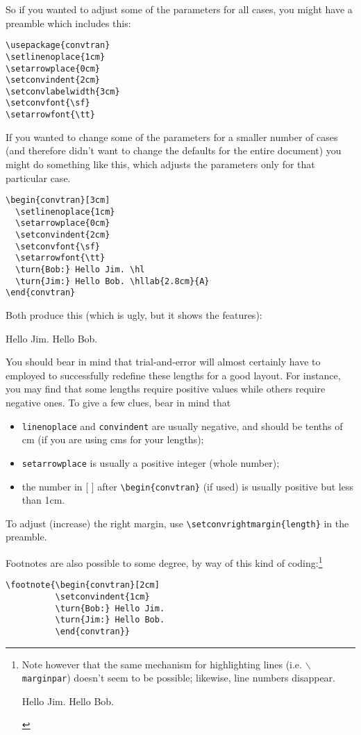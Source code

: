 \documentclass[a4paper]{article}
\begin{document}
So if you wanted to adjust some of the parameters for all cases, you might
have a preamble which includes this:
\begin{verbatim}
\usepackage{convtran}
\setlinenoplace{1cm}
\setarrowplace{0cm}
\setconvindent{2cm}
\setconvlabelwidth{3cm}
\setconvfont{\sf}
\setarrowfont{\tt}
\end{verbatim}
If you wanted to change some of the parameters for a smaller number of
cases (and therefore didn't want to change the defaults for the entire
document) you might do something like this, which adjusts the
parameters only for that particular case.
\begin{verbatim}
\begin{convtran}[3cm]
  \setlinenoplace{1cm}
  \setarrowplace{0cm}
  \setconvindent{2cm}
  \setconvfont{\sf}
  \setarrowfont{\tt}
  \turn{Bob:} Hello Jim. \hl
  \turn{Jim:} Hello Bob. \hllab{2.8cm}{A}
\end{convtran}
\end{verbatim}
Both produce this (which is ugly, but it shows the features):
\begin{convtran}[3cm]
  \setlinenoplace{1cm}
  \setarrowplace{0cm}
  \setconvindent{2cm}
  \setconvfont{\sf}
  \setarrowfont{\tt}
   Hello Jim. \hl
   Hello Bob. 
\end{convtran}

You should bear in mind that trial-and-error will almost certainly
have to employed to successfully redefine these lengths for a good
layout.  For instance, you may find that some lengths require positive
values while others require negative ones.  To give a few clues, bear
in mind that 
\begin{itemize}
\item \verb!linenoplace! and \verb!convindent! are usually negative,
  and should be tenths of cm (if you are using cms for your lengths);
\item \verb!setarrowplace! is usually a positive integer (whole number);
\item the number in [ ] after \verb!\begin{convtran}! (if used) is
  usually positive but less than 1cm.
\end{itemize}

To adjust (increase) the right margin, use
\verb!\setconvrightmargin{length}! in the preamble.

Footnotes are also possible to some degree, by way of this kind of
coding:\footnote{Note however that the same mechanism for highlighting
  lines (i.e. $\backslash$\texttt{marginpar}) doesn't seem to be possible;
  likewise, line numbers disappear.
    \begin{convtran}[2cm]
    \setconvindent{1cm}
     Hello Jim.  
     Hello Bob.
    \end{convtran}}
\begin{verbatim}
\footnote{\begin{convtran}[2cm]
          \setconvindent{1cm}
          \turn{Bob:} Hello Jim.  
          \turn{Jim:} Hello Bob.
          \end{convtran}}
\end{verbatim}
\end{document}
